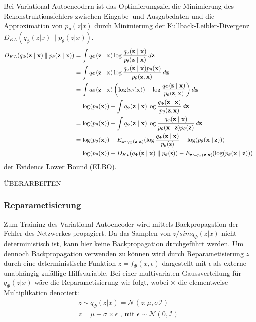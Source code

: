 \label{elbo}
Bei Variational Autoencodern ist das Optimierungsziel die Minimierung des Rekonstruktionsfehlers zwischen Eingabe- und Ausgabedaten und die Approximation von $p_\theta (z|x)$ durch Minimierung der Kullback-Leibler-Divergenz $D_{KL}(q_\phi (z|x) \parallel p_\theta (z|x) )$.
\begin{align*}
    \small
    D_{KL}(q_\Phi(\mathbf{z\mid x})\parallel p_\theta(\mathbf{z\mid x})) &= \int q_\Phi(\mathbf{z\mid x}) \log \frac{q_\Phi(\mathbf{z\mid x})}{p_\theta(\mathbf{z\mid x})} \, d\mathbf{z}\\
    &= \int q_\Phi(\mathbf{z\mid x}) \log \frac{q_\Phi(\mathbf{z\mid x})p_\theta(\mathbf{x})}{p_\theta(\mathbf{z,x})} \,d\mathbf{z}\\
    &= \int q_\Phi(\mathbf{z\mid x}) \left( \log (p_\theta(\mathbf{x})) + \log \frac{q_\Phi(\mathbf{z\mid x})}{p_\theta(\mathbf{z,x})}\right) d\mathbf{z}\\
    &= \log (p_\theta(\mathbf{x})) + \int q_\Phi(\mathbf{z\mid x}) \log \frac{q_\Phi(\mathbf{z\mid x})}{p_\theta(\mathbf{z,x})} \,d\mathbf{z}\\
    &= \log (p_\theta(\mathbf{x})) + \int q_\Phi(\mathbf{z\mid x}) \log \frac{q_\Phi(\mathbf{z\mid x})}{p_\theta(\mathbf{x\mid z})p_\theta(\mathbf{z})} \,d\mathbf{z}\\
    &= \log (p_\theta(\mathbf{x})) + E_{\mathbf{z} \sim q_\Phi(\mathbf{z\mid x})}(\log \frac{q_\Phi(\mathbf{z\mid x})}{p_\theta(\mathbf{z})} - \log(p_\theta(\mathbf{x\mid z})))\\
    &= \log (p_\theta(\mathbf{x})) + D_{KL}(q_\Phi(\mathbf{z\mid x}) \parallel p_\theta(\mathbf{z})) - E_{\mathbf{z} \sim q_\Phi(\mathbf{z\mid x})}(\log(p_\theta(\mathbf{x\mid z})))
    \end{align*}
der \textbf{E}vidence \textbf{L}ower \textbf{B}ound (ELBO).


ÜBERARBEITEN
\subsubsection{Reparametisierung} %
Zum Training des Variational Autoencoder wird mittels Backpropagation der Fehler des Netzwerkes propagiert. Da das Samplen von $z /sim q_\Phi(z|x)$ nicht deterministisch ist, kann hier keine Backpropagation durchgeführt werden.
Um dennoch Backpropagation verwenden zu können wird durch Reparametisierung $z$ durch eine deterministische Funktion $z=f_\Phi(x,\epsilon)$ dargestellt mit $\epsilon$ als externe unabhängig zufällige Hilfsvariable. 
Bei einer multivariaten Gaussverteilung für $q_\Phi (z|x)$ wäre die Reparametisierung wie folgt, wobei $\times$ die elementweise Multiplikation denotiert:
\begin{align}
    z \sim q_\Phi(z|x) = \mathcal{N}(z;\mu,\sigma \mathcal{I}) \\
    z = \mu + \sigma \times \epsilon \text{ , mit } \epsilon \sim \mathcal{N}(0,\mathcal{I}) 
\end{align}

